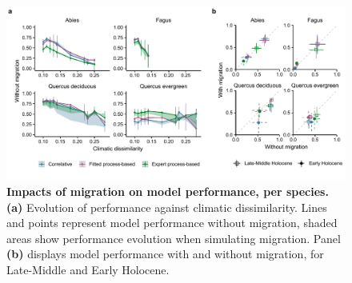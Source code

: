 \documentclass[pdflatex, sn-nature, oneside]{sn-jnl}%
\begin{document}
\begin{figure}
\hspace*{-0.8in}
\centering
\includegraphics{performance_perspeciesmigration-1.pdf}
\caption{\textbf{Impacts of migration on model performance, per species.} \textbf{(a)} Evolution of performance against climatic dissimilarity. Lines and points represent model performance without migration, shaded areas show performance evolution when simulating migration. Panel \textbf{(b)} displays model performance with and without migration, for Late-Middle and Early Holocene.}
\end{figure}
\end{document}
